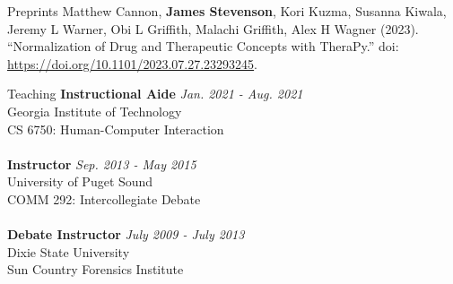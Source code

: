 \documentclass{cv} %
\begin{document}
\begin{rSection}{Preprints}
{Matthew Cannon, \textbf{James Stevenson}, Kori Kuzma, Susanna Kiwala, Jeremy L Warner, Obi L Griffith, Malachi Griffith, Alex H Wagner (2023). ``Normalization of Drug and Therapeutic Concepts with TheraPy.'' doi: \url{https://doi.org/10.1101/2023.07.27.23293245}.}
\end{rSection}


\begin{rSection}{Teaching}
{\bf Instructional Aide} \hfill {\em Jan. 2021 - Aug. 2021}\\
Georgia Institute of Technology\\
CS 6750: Human-Computer Interaction\\
\\
{\bf Instructor} \hfill {\em Sep. 2013 - May 2015}\\
University of Puget Sound\\
COMM 292: Intercollegiate Debate\\
\\
{\bf Debate Instructor} \hfill {\em July 2009 - July 2013}\\
Dixie State University\\
Sun Country Forensics Institute\\
\end{rSection}
\end{document}
